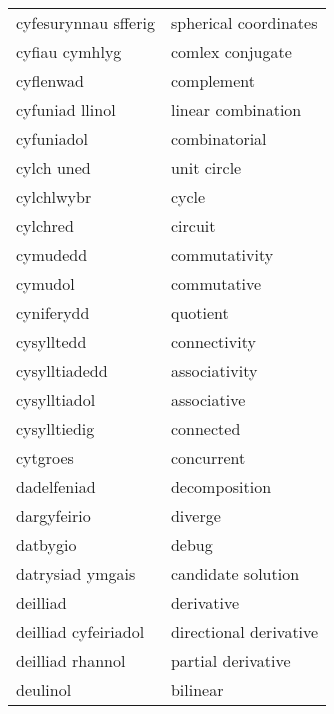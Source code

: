 \begin{supertabular}{p{0.22\textwidth}p{0.22\textwidth}}
            cyfesurynnau sfferig &             spherical coordinates \\
                  cyfiau cymhlyg &                  comlex conjugate \\
                       cyflenwad &                        complement \\
                 cyfuniad llinol &                linear combination \\
                      cyfuniadol &                     combinatorial \\
                      cylch uned &                       unit circle \\
                      cylchlwybr &                             cycle \\
                        cylchred &                           circuit \\
                        cymudedd &                     commutativity \\
                         cymudol &                       commutative \\
                      cyniferydd &                          quotient \\
                      cysylltedd &                      connectivity \\
                   cysylltiadedd &                     associativity \\
                    cysylltiadol &                       associative \\
                    cysylltiedig &                         connected \\
                        cytgroes &                        concurrent \\
                     dadelfeniad &                     decomposition \\
                     dargyfeirio &                           diverge \\
                        datbygio &                             debug \\
                datrysiad ymgais &                candidate solution \\
                        deilliad &                        derivative \\
            deilliad cyfeiriadol &            directional derivative \\
                deilliad rhannol &                partial derivative \\
                        deulinol &                          bilinear \\

\end{supertabular}
